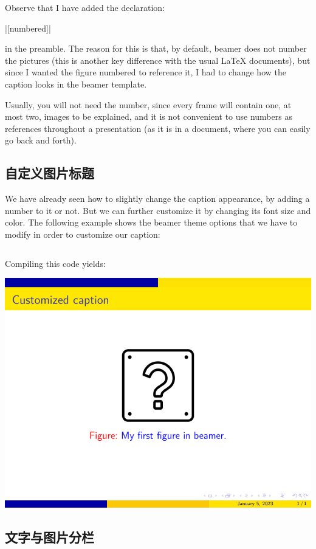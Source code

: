 Observe that I have added the declaration:

|[numbered]|

in the preamble. The reason for this is that, by default, beamer does not number
the pictures (this is another key difference with the usual {\LaTeX} documents), but since I wanted the figure numbered to reference it, I had to change how the caption looks in the beamer template.

Usually, you will not need the number, since every frame will contain one, at most two, images to be explained, and it is not convenient to use numbers as references throughout a presentation (as it is in a document, where you can easily go back and forth).

\subsection{自定义图片标题}

We have already seen how to slightly change the caption appearance, by adding a number to it or not. But we can further customize it by changing its font size and color. The following example shows the beamer theme options that we have to modify in order to customize our caption:

\inputminted[linenos=true]{latex}{examples/beamer/figure-caption2.tex}

Compiling this code yields:

\includegraphics{examples/beamer/figure-caption2.pdf}

\subsection{文字与图片分栏}

